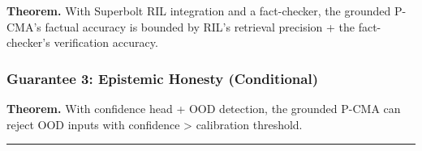 \documentclass[
  11pt,
  a4paper,
]{article}
\begin{document}
\textbf{Theorem.} With Superbolt RIL integration and a fact-checker, the
grounded P-CMA's factual accuracy is bounded by RIL's retrieval
precision + the fact-checker's verification accuracy.

\subsubsection{Guarantee 3: Epistemic Honesty
(Conditional)}\label{guarantee-3-epistemic-honesty-conditional}

\textbf{Theorem.} With confidence head + OOD detection, the grounded
P-CMA can reject OOD inputs with confidence \textgreater{} calibration
threshold.

\begin{center}\rule{0.5\linewidth}{0.5pt}\end{center}
\end{document}
